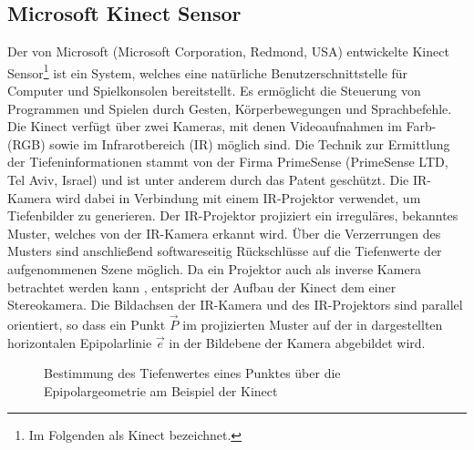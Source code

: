 \subsection{Microsoft Kinect\textsuperscript{\texttrademark} Sensor}
\label{chap.kinect}
Der von Microsoft (Microsoft Corporation, Redmond, USA) entwickelte Kinect\textsuperscript{\texttrademark} Sensor\footnote{Im Folgenden als Kinect bezeichnet.} ist ein System, welches eine natürliche Benutzerschnittstelle für Computer und Spielkonsolen bereitstellt. Es ermöglicht die Steuerung von Programmen und Spielen durch Gesten, Körperbewegungen und Sprachbefehle. Die Kinect verfügt über zwei Kameras, mit denen Videoaufnahmen im Farb- (RGB) sowie im Infrarotbereich (IR) möglich sind. Die Technik zur Ermittlung der Tiefeninformationen stammt von der Firma PrimeSense (PrimeSense LTD, Tel Aviv, Israel) und ist unter anderem durch das Patent \cite{Freedman2008} geschützt. Die IR-Kamera wird dabei in Verbindung mit einem IR-Projektor verwendet, um Tiefenbilder zu generieren. Der IR-Projektor projiziert ein irreguläres, bekanntes Muster, welches von der IR-Kamera erkannt wird. Über die Verzerrungen des Musters sind anschließend softwareseitig Rückschlüsse auf die Tiefenwerte der aufgenommenen Szene möglich. Da ein Projektor auch als inverse Kamera betrachtet werden kann \cite{Kimura2007}, entspricht der Aufbau der Kinect dem einer Stereokamera. Die Bildachsen der IR-Kamera und des IR-Projektors sind parallel orientiert, so dass ein Punkt $\vec{P}$ im projizierten Muster auf der in  dargestellten horizontalen Epipolarlinie $\vec{e}$ in der Bildebene der Kamera abgebildet wird.\\


\begin{figure}[ht]
	\begin{center}
		\caption{Bestimmung des Tiefenwertes eines Punktes über die Epipolargeometrie am Beispiel der Kinect}
		\label{fig.kinect_depth}
	\end{center}
\end{figure}

\prever{
}

